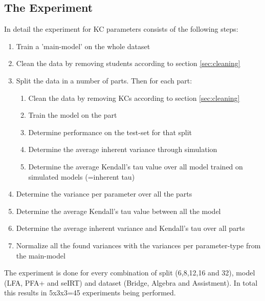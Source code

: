 \documentclass{scrartcl}
\begin{document}
\subsection{The Experiment}
In detail the experiment for KC parameters consists of the following steps:
\begin{enumerate}
\item Train a 'main-model' on the whole dataset
\item Clean the data by removing students according to section \ref{sec:cleaning}
\item Split the data in a number of parts. Then for each part:
\begin{enumerate}
\item Clean the data by removing KCs according to section \ref{sec:cleaning}
\item Train the model on the part
\item Determine performance on the test-set for that split
\item Determine the average inherent variance through simulation
\item Determine the average Kendall's tau value over all model trained on simulated models (=inherent tau)
\end{enumerate}
\item Determine the variance per parameter over all the parts
\item Determine the average Kendall's tau value between all the model
\item Determine the average inherent variance and Kendall's tau over all parts 
\item Normalize all the found variances with the variances per parameter-type from the main-model
\end{enumerate}

The experiment is done for every combination of split (6,8,12,16 and 32), model (LFA, PFA+ and seIRT) and dataset (Bridge, Algebra and Assistment). In total this results in 5x3x3=45 experiments being performed.
\end{document}
